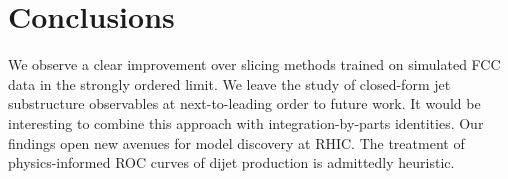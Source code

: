 \section{Conclusions}\label{sec:conclusions}

We observe a clear improvement over slicing methods trained on simulated
FCC data in the strongly ordered limit. We leave the study of
closed-form jet substructure observables at next-to-leading order to
future work. It would be interesting to combine this approach with
integration-by-parts identities. Our findings open new avenues for model
discovery at RHIC. The treatment of physics-informed ROC curves of dijet
production is admittedly heuristic.

